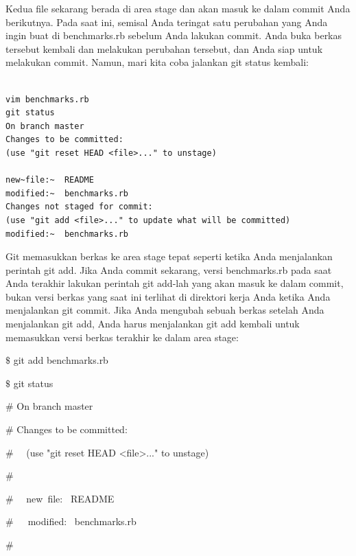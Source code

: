 \vspace{14pt}
\noindent 
{\fontsize{14pt}{14pt}\selectfont Kedua file sekarang berada di area stage dan akan masuk ke dalam commit Anda berikutnya. Pada saat ini, semisal Anda teringat satu perubahan yang Anda ingin buat di benchmarks.rb sebelum Anda lakukan commit. Anda buka berkas tersebut kembali dan melakukan perubahan tersebut, dan Anda siap untuk melakukan commit. Namun, mari kita coba jalankan $  $git status $  $kembali: \\} \par

\begin{verbatim}

vim benchmarks.rb
git status
On branch master
Changes to be committed:
(use "git reset HEAD <file>..." to unstage)

new~file:~  README
modified:~  benchmarks.rb
Changes not staged for commit: 
(use "git add <file>..." to update what will be committed)
modified:~  benchmarks.rb

\end{verbatim}
\noindent 
{\fontsize{14pt}{14pt}\selectfont Git memasukkan berkas ke area stage tepat seperti ketika Anda menjalankan perintah $  $git add. Jika Anda commit sekarang, versi benchmarks.rb pada saat Anda terakhir lakukan perintah $  $git add-lah yang akan masuk ke dalam commit, bukan versi berkas yang saat ini terlihat di direktori kerja Anda ketika Anda menjalankan $  $git commit. Jika Anda mengubah sebuah berkas setelah Anda menjalankan $  $git add, Anda harus menjalankan $  $git add $  $kembali untuk memasukkan versi berkas terakhir ke dalam area stage: \\} \par
\vspace{14pt}
\noindent 
{\fontsize{14pt}{14pt}\selectfont  $  \$  $ git add benchmarks.rb \\} \par
\noindent 
{\fontsize{14pt}{14pt}\selectfont  $  \$  $ git status \\} \par
\noindent 
{\fontsize{14pt}{14pt}\selectfont  $  \#  $ On branch master \\} \par
\noindent 
{\fontsize{14pt}{14pt}\selectfont  $  \#  $ Changes to be committed: \\} \par
\noindent 
{\fontsize{14pt}{14pt}\selectfont  $  \#  $~~ (use "git reset HEAD <file>..." to unstage) \\} \par
\noindent 
{\fontsize{14pt}{14pt}\selectfont  $  \#  $ \\} \par
\noindent 
{\fontsize{14pt}{14pt}\selectfont  $  \#  $~~ new~file:~  README \\} \par
\noindent 
{\fontsize{14pt}{14pt}\selectfont  $  \#  $~~~modified:~  benchmarks.rb \\} \par
\noindent 
{\fontsize{14pt}{14pt}\selectfont  $  \#  $ \\} \par
\vspace{14pt}
